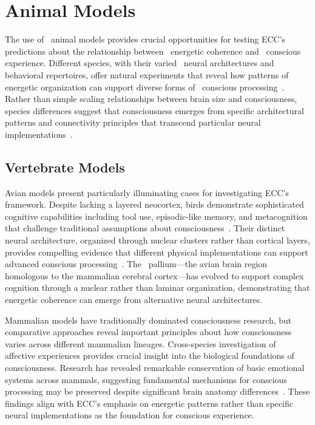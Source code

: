 \section{Animal Models}

The use of~ animal models provides crucial opportunities for testing ECC's predictions about the relationship between~ energetic coherence and~ conscious experience. Different species, with their varied~ neural architectures and behavioral repertoires, offer natural experiments that reveal how patterns of~ energetic organization can support diverse forms of~ conscious processing~\cite{Boly2013, butlin2023consciousnessartificialintelligenceinsights}. Rather than simple scaling relationships between brain size and consciousness,~ species differences suggest that consciousness emerges from specific architectural patterns and connectivity principles that transcend particular neural implementations~\cite{Roth2005, bullmore2012economy}.

\subsection*{Vertebrate Models}

 Avian models present particularly illuminating cases for investigating ECC's framework. Despite lacking a layered neocortex, birds demonstrate sophisticated~ cognitive capabilities including tool use, episodic-like memory, and metacognition that challenge traditional assumptions about consciousness~\cite{Gunturkun2016, Clayton2015}. Their distinct~ neural architecture, organized through nuclear clusters rather than cortical layers, provides compelling evidence that different physical implementations can support advanced conscious processing~\cite{Jarvis2009}. The~ pallium—the avian brain region homologous to the mammalian cerebral cortex—has evolved to support complex cognition through a nuclear rather than laminar organization, demonstrating that energetic coherence can emerge from alternative neural architectures.

Mammalian models have traditionally dominated consciousness research, but comparative approaches reveal important principles about how consciousness varies across different mammalian lineages. Cross-species investigation of~ affective experiences provides crucial insight into the biological foundations of consciousness. Research has revealed remarkable conservation of basic emotional systems across mammals, suggesting fundamental mechanisms for conscious processing may be preserved despite significant brain anatomy differences~\cite{Panksepp2011, barrett2017emotions}. These findings align with ECC's emphasis on energetic patterns rather than specific neural implementations as the foundation for conscious experience.

